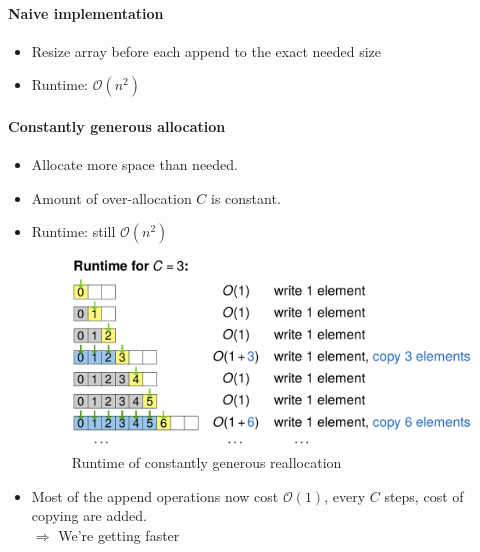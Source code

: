 \documentclass[12pt, a4paper]{scrartcl}
\newcommand{\bigO}{\mathcal{O}}
\renewcommand{\implies}{\Rightarrow}
\begin{document}
\paragraph{Naive implementation}
\begin{itemize}
\item Resize array before each append to the exact needed size
\item Runtime: $\bigO(n^2)$
\end{itemize}

\paragraph{Constantly generous allocation}
\begin{itemize}
\item Allocate more space than needed.
\item Amount of over-allocation $C$ is constant.
\item Runtime: still $\bigO(n^2)$
\begin{figure}[htbp]
  \centering
  \includegraphics[width=.7\textwidth]{constant_reallocation}
  \caption{Runtime of constantly generous reallocation}
  \label{fig:constant_reallocation}
\end{figure}
\item Most of the append operations now cost $\bigO(1)$, every $C$ steps, cost of copying are added.\\$\implies$ We're getting faster
\end{itemize}
\end{document}
